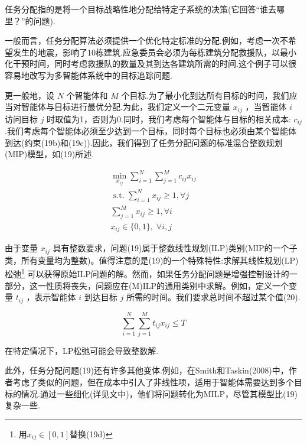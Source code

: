 \documentclass[10pt]{article}
\begin{document}
任务分配指的是将一个目标战略性地分配给特定子系统的决策(它回答“谁去哪里？”的问题).

一般而言，任务分配算法必须提供一个优化特定标准的分配.例如，考虑一次不希望发生的地震，影响了10栋建筑.应急委员会必须为每栋建筑分配救援队，以最小化干预时间，同时考虑救援队的数量及其到达各建筑所需的时间.这个例子可以很容易地改写为多智能体系统中的目标追踪问题.

更一般地，设 \(N\) 个智能体和 \(M\) 个目标.为了最小化到达所有目标的时间，我们应当对智能体与目标进行最优分配.为此，我们定义一个二元变量 \({x}_{ij}\) ，当智能体 \(i\) 访问目标 \(j\) 时取值为1，否则为0.同时，我们考虑每个智能体与目标的相关成本: \({c}_{ij}\) .我们考虑每个智能体必须至少达到一个目标，同时每个目标也必须由某个智能体到达(约束(19b)和(19c)).因此，我们得到了任务分配问题的标准混合整数规划(MIP)模型，如(19)所述.

\begin{subequations}
\begin{gather}
\mathop{\min }\limits_{{x}_{ij}}\mathop{\sum }\limits_{{i = 1}}^{N}\mathop{\sum }\limits_{{j = 1}}^{M}{c}_{ij}{x}_{ij} \\
\text{ s.t. }\mathop{\sum }\limits_{{i = 1}}^{N}{x}_{ij} \geq  1,\forall j \\
\mathop{\sum }\limits_{{j = 1}}^{M}{x}_{ij} \geq  1,\forall i \\
{x}_{ij} \in  \{ 0,1\} ,\;\forall i,j
\end{gather}
\end{subequations}

由于变量 \({x}_{ij}\) 具有整数要求，问题(19)属于整数线性规划(ILP)类别(MIP的一个子类，所有变量均为整数)。值得注意的是(19)的一个特殊特性:求解其线性规划(LP)松弛\footnote{用$x_{ij}\in[0,1]$替换(19d)} 可以获得原始ILP问题的解。然而，如果任务分配问题是增强控制设计的一部分，这一性质将丧失，问题应在(M)ILP的通用类别中求解。例如，定义一个变量 \({t}_{ij}\) ，表示智能体 \(i\) 到达目标 \(j\) 所需的时间。我们要求总时间不超过某个值(20).

\begin{equation}
\mathop{\sum }\limits_{{i = 1}}^{N}\mathop{\sum }\limits_{{j = 1}}^{M}{t}_{ij}{x}_{ij} \leq  T
\end{equation}

在特定情况下，LP松弛可能会导致整数解.

此外，任务分配问题(19)还有许多其他变体.例如，在Smith和Taskin(2008)中，作者考虑了类似的问题，但在成本中引入了非线性项，适用于智能体需要达到多个目标的情况.通过一些细化(详见文中)，他们将问题转化为MILP，尽管其模型比(19)复杂一些.
\end{document}
